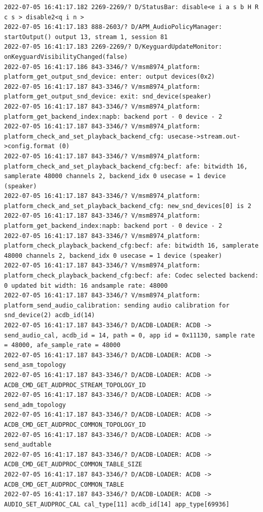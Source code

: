 \documentclass[a4paper,12pt]{book}
\begin{document}
\begin{lstlisting}
2022-07-05 16:41:17.182 2269-2269/? D/StatusBar: disable<e i a s b H R c s > disable2<q i n >
2022-07-05 16:41:17.183 888-2603/? D/APM_AudioPolicyManager: startOutput() output 13, stream 1, session 81
2022-07-05 16:41:17.183 2269-2269/? D/KeyguardUpdateMonitor: onKeyguardVisibilityChanged(false)
2022-07-05 16:41:17.186 843-3346/? V/msm8974_platform: platform_get_output_snd_device: enter: output devices(0x2)
2022-07-05 16:41:17.187 843-3346/? V/msm8974_platform: platform_get_output_snd_device: exit: snd_device(speaker)
2022-07-05 16:41:17.187 843-3346/? V/msm8974_platform: platform_get_backend_index:napb: backend port - 0 device - 2 
2022-07-05 16:41:17.187 843-3346/? V/msm8974_platform: platform_check_and_set_playback_backend_cfg: usecase->stream.out->config.format (0)
2022-07-05 16:41:17.187 843-3346/? V/msm8974_platform: platform_check_and_set_playback_backend_cfg:becf: afe: bitwidth 16, samplerate 48000 channels 2, backend_idx 0 usecase = 1 device (speaker)
2022-07-05 16:41:17.187 843-3346/? V/msm8974_platform: platform_check_and_set_playback_backend_cfg: new_snd_devices[0] is 2
2022-07-05 16:41:17.187 843-3346/? V/msm8974_platform: platform_get_backend_index:napb: backend port - 0 device - 2 
2022-07-05 16:41:17.187 843-3346/? V/msm8974_platform: platform_check_playback_backend_cfg:becf: afe: bitwidth 16, samplerate 48000 channels 2, backend_idx 0 usecase = 1 device (speaker)
2022-07-05 16:41:17.187 843-3346/? V/msm8974_platform: platform_check_playback_backend_cfg:becf: afe: Codec selected backend: 0 updated bit width: 16 andsample rate: 48000
2022-07-05 16:41:17.187 843-3346/? V/msm8974_platform: platform_send_audio_calibration: sending audio calibration for snd_device(2) acdb_id(14)
2022-07-05 16:41:17.187 843-3346/? D/ACDB-LOADER: ACDB -> send_audio_cal, acdb_id = 14, path = 0, app id = 0x11130, sample rate = 48000, afe_sample_rate = 48000
2022-07-05 16:41:17.187 843-3346/? D/ACDB-LOADER: ACDB -> send_asm_topology
2022-07-05 16:41:17.187 843-3346/? D/ACDB-LOADER: ACDB -> ACDB_CMD_GET_AUDPROC_STREAM_TOPOLOGY_ID
2022-07-05 16:41:17.187 843-3346/? D/ACDB-LOADER: ACDB -> send_adm_topology
2022-07-05 16:41:17.187 843-3346/? D/ACDB-LOADER: ACDB -> ACDB_CMD_GET_AUDPROC_COMMON_TOPOLOGY_ID
2022-07-05 16:41:17.187 843-3346/? D/ACDB-LOADER: ACDB -> send_audtable
2022-07-05 16:41:17.187 843-3346/? D/ACDB-LOADER: ACDB -> ACDB_CMD_GET_AUDPROC_COMMON_TABLE_SIZE
2022-07-05 16:41:17.187 843-3346/? D/ACDB-LOADER: ACDB -> ACDB_CMD_GET_AUDPROC_COMMON_TABLE
2022-07-05 16:41:17.187 843-3346/? D/ACDB-LOADER: ACDB -> AUDIO_SET_AUDPROC_CAL cal_type[11] acdb_id[14] app_type[69936]

\end{lstlisting}
\end{document}
